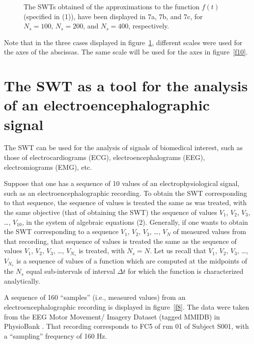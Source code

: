 \documentclass[11pt]{rMTA2010} \usepackage[utf8]{inputenc} \usepackage{graphicx} \usepackage{booktabs} \usepackage{array} \usepackage{enumerate}
\begin{document}
\begin{figure}
\centering
{}\qquad
{}\qquad
\caption[]{}
\end{figure}

\begin{figure}
\ContinuedFloat
{}\qquad
\caption{The SWTs obtained of the approximations to the function $f(t)$ (specified in (1)), have been displayed in 7a, 7b, and 7c, for $N_{s}=100$, $N_{s}=200$, and $N_{s}=400$, respectively.}
\label{f7}
\end{figure}
\newpage
Note that in the three cases displayed in figure~\ref{f7}, different scales were used for the axes of the abscissas. The same scale will be used for the axes in figure~\ref{f10}.

\section{The SWT as a tool for the analysis of an electroencephalographic signal}

The SWT can be used for the analysis of signals of biomedical interest, such as those of electrocardiograms (ECG), electroencephalograms (EEG), electromiograms (EMG), etc.

Suppose that one has a sequence of 10 values of an electrophysiological signal, such as an electroencephalographic recording. To obtain the SWT corresponding to that sequence, the sequence of values is treated the same as was treated, with the same objective (that of obtaining the SWT) the sequence of values $V_1$, $V_2$, $V_3$, \ldots, $V_{10}$, in the system of algebraic equations (2). Generally, if one wants to obtain the SWT corresponding to a sequence $V_1$, $V_2$, $V_3$, \ldots, $V_{N}$ of measured values from that recording, that sequence of values is treated the same as the sequence of values  $V_1$, $V_2$, $V_3$, \ldots, $V_{N_s}$ is treated, with $N_{s}=N$. Let us recall that $V_1$, $V_2$, $V_3$, \ldots, $V_{N_s}$ is a sequence of values of a function which are computed at the midpoints of the $N_{s}$ equal sub-intervals of interval $\Delta t$ for which the function is characterized analytically.

A sequence of 160 ``samples'' (i.e., measured values) from an electroencephalographic recording is displayed in figure~\ref{f8}. The data were taken from the EEG Motor Movement/ Imagery Dataset (tagged MMIDB) in PhysioBank \cite{b5}. That recording corresponds to FC5 of run 01 of Subject S001, with a ``sampling'' frequency of 160 Hz.
\end{document}

